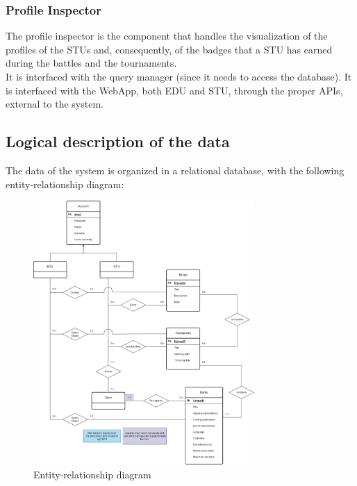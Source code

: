 \subsubsection*{Profile Inspector}
The profile inspector is the component that handles the visualization of the profiles of the STUs and, consequently, of the badges that a STU has earned during the battles and the tournaments.\\
It is interfaced with the query manager (since it needs to access the database).
It is interfaced with the WebApp, both EDU and STU, through the proper APIs, external to the system.

\subsection{Logical description of the data}
The data of the system is organized in a relational database, with the following entity-relationship diagram:

\begin{figure}[H]
    \centering
    \includegraphics[width=0.75\textwidth]{images/diagrams/er_diagram.png}
    \caption{Entity-relationship diagram}
\end{figure}

